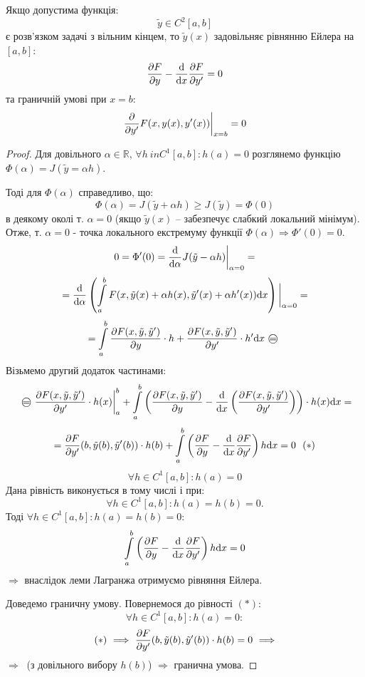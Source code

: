 \begin{boxteo}
Якщо допустима функція:
$$
\tilde{y} \in C^2[a,b]
$$
є розв'язком задачі з вільним кінцем, то $\tilde{y} (x)$ задовільняє рівнянню Ейлера на $[a,b]$:
$$
\frac{\partial F
}{\partial y}  - \frac{\mathrm{d} }{\mathrm{d} x} \frac{\partial F }{\partial y'} = 0
$$
та граничній умові при $x = b$:
$$
\frac{\partial }{
\partial y'
} F(x, y(x), y'(x))\bigg|_{x=b} = 0
$$
\end{boxteo}
\begin{proof}
Для довільного $\alpha \in \mathbb{R}$, $\forall h\ in C^1 [a,b]:h(a)=0$ розглянемо функцію $\Phi (\alpha) = J(\tilde{y} = \alpha h)$.\par
Тоді для $\Phi (\alpha)$ справедливо, що:
$$
\Phi (\alpha) = J(\tilde{y} + \alpha h) \geq J(\tilde{y}) = \Phi(0)
$$
в деякому околі т. $\alpha = 0$ (якщо $\tilde{y}(x)$  -- забезпечує слабкий локальний мінімум).
Отже, т. $\alpha = 0$ - точка локального екстремуму функції $\Phi (\alpha) \Rightarrow \Phi' (0) = 0$.
$$
0 = \Phi'(0) = \frac{\mathrm{d} }{ \mathrm{d} \alpha} J(\tilde{y} - \alpha h) \bigg|_{\alpha = 0} =
$$
$$
= \frac{\mathrm{d}}{\mathrm{d} \alpha} \left(   \int\limits_{a}^{b}{
F(x, \tilde{y}(x) + \alpha h(x), \tilde{y}' (x) + \alpha h' (x) ) \mathrm{d}x
} \right) \bigg|_{\alpha = 0} =
$$
$$
=  \int\limits_{a}^{b}{ \frac{\d F(x, \ty, \ty')}{\d y} \cdot h + \frac{\d F(x, \ty, \ty')}{\d y'} \cdot h' } \mathrm{d} x \oeq
$$
Візьмемо другий додаток частинами:
$$
\oeq \frac{\d F(x,\ty, \ty')}{\d y'} \cdot h(x) \bigg|_{a}^{b} +  \int\limits_{a}^{b}{
\left(
\frac{\d F(x, \ty, \ty')}{\d y} - \frac{\mathrm{d}}{\mathrm{d} x} \left(
\frac{\d F(x, \ty, \ty')}{\d y'}
 \right)
 \right)\cdot h(x) \mathrm{d} x =
}
$$
$$
= \frac{\partial F}{\partial y'} (b, \tilde{y}(b), \tilde{y}'(b)) \cdot h(b) +  \int\limits_{a}^{b}{
\left( \frac{\partial F}{ \partial y} - \frac{\mathrm{d}}{\mathrm{d} x} \frac{\partial F}{\partial y'}    \right) h \mathrm{d} x = 0 \ \ (*)
}
$$
$$
\forall h \in C^1 [a,b] : h(a) = 0
$$
Дана рівність виконується в тому числі і при:
$$
\forall h \in C^1 [a,b] : h(a) = h(b) = 0.
$$
Тоді $\forall h \in C^1[a,b] : h(a) = h(b) = 0$:
$$
 \int\limits_{a }^{b}{ \left( \frac{\partial F}{\partial y} - \frac{\mathrm{d}}{\mathrm{d} x} \frac{\partial F}{\partial y'}    \right)
h \mathrm{d} x = 0
 }
$$
$\Longrightarrow $ внаслідок леми Лагранжа отримуємо рівняння Ейлера.\par
Доведемо граничну умову. Повернемося до рівності $(*)$:
$$
\forall h \in C^1 [a,b] : h(a) = 0:
$$
$$
(*) \ \Longrightarrow \ \frac{\partial F}{\partial y'} (b, \tilde{y}(b), \tilde{y}'(b)) \cdot h(b) =0 \ \Longrightarrow
$$
$\Longrightarrow \ $ (з довільного вибору $h(b)$) $\Longrightarrow$ гранична умова.
\end{proof}
